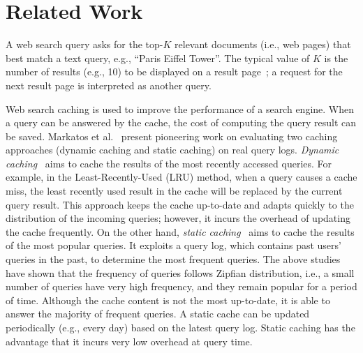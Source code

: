 \documentclass{sig-alternate}
\newcommand{\stitle}[1]{\vspace*{0.4em}\noindent{\bf #1:\/}}
\newcommand{\spath}{SP\xspace}
\begin{document}







\section{Related Work} \label{sec:relwork}
%


\stitle{Web Search Caching}
%
A web search query asks for the top-$K$ relevant documents (i.e., web pages)
that best match a text query, e.g., ``Paris Eiffel Tower''.
The typical value of $K$ is the number of results (e.g., 10) to be displayed on a result page~\cite{Ozcan2011};
a request for the next result page is interpreted as another query.

Web search caching is used to improve the performance of a search engine.
When a query can be answered by the cache, the cost of computing the query result can be saved.
%
%
Markatos et al.~\cite{Markatos01} present pioneering work on evaluating two caching approaches
(dynamic caching and static caching) on real query logs.
{\em Dynamic caching}~\cite{Markatos01,LongS05,GanS09} aims to cache the results of the most recently accessed queries.
For example, in the Least-Recently-Used (LRU) method,
when a query causes a cache miss, the least recently used result in the cache will be replaced by the current query result.
This approach keeps the cache up-to-date and adapts quickly to the distribution of the incoming queries;
however, it incurs the overhead of updating the cache frequently.
%
On the other hand, {\em static caching}~\cite{Markatos01,BaezaYates03,BaezaYates07,AltingovdeOU09,OzcanAU08,Ozcan2011}
aims to cache the results of the most popular queries.
It exploits a query log, which contains past users' queries in the past, to determine the most frequent queries.
The above studies have shown that
the frequency of queries follows Zipfian distribution, i.e., a small number of queries
have very high frequency, and they remain popular for a period of time.
Although the cache content is not the most up-to-date, it is able to answer the majority of frequent queries.
A static cache can be updated periodically (e.g., every day) based on the latest query log.
Static caching has the advantage that it incurs very low overhead at query time.
\end{document}
